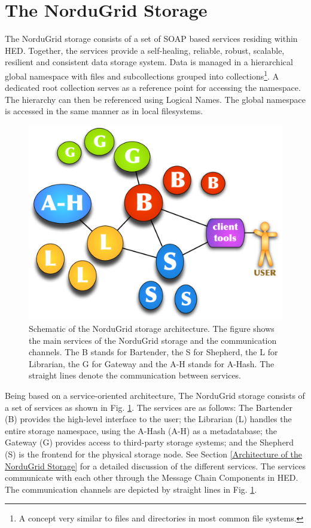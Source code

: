 \documentclass{llncs}
\begin{document}
\section{The NorduGrid Storage}
\label{The NorduGrid Storage}

The NorduGrid storage consists of a set of SOAP based services residing
within HED. Together, the services provide a self-healing, reliable, robust,
scalable, resilient and consistent data storage system. Data is
managed in a hierarchical global namespace with files and
subcollections grouped into collections\footnote{A concept very
  similar to files and directories in most common file systems.}.  A
dedicated root collection serves as a reference point for accessing the namespace. The hierarchy can then be
referenced using Logical Names. The global namespace is accessed
in the same manner as in local filesystems.

\begin{figure}
  \begin{center}
    \includegraphics[width=0.35\columnwidth]{arc1-storage-services-with-gateway.pdf}
  \end{center}
  \caption{Schematic of the NorduGrid storage architecture. The figure shows
    the main services of the NorduGrid storage and the communication channels. The B stands for Bartender, the S for Shepherd, the L for Librarian, the G for Gateway and the A-H stands for A-Hash. The straight lines denote the communication between services.}
  \label{fig:arc1_storage_service}
\end{figure}


Being based on a service-oriented architecture, The NorduGrid storage consists of a set of services as shown in Fig.
\ref{fig:arc1_storage_service}. The services are as follows: The Bartender (B)
provides the high-level interface to the user; the Librarian (L)
handles the entire storage namespace, using the A-Hash (A-H) as a metadatabase; the
Gateway (G) provides access to third-party storage systems; and
the Shepherd (S) is the frontend for the physical storage node. 
See Section \ref{Architecture of the NorduGrid Storage} for a detailed
discussion of the different services.   
The services communicate with each other through the
Message Chain Components in HED. The communication channels are
depicted by straight lines in Fig. \ref{fig:arc1_storage_service}.
\end{document}
